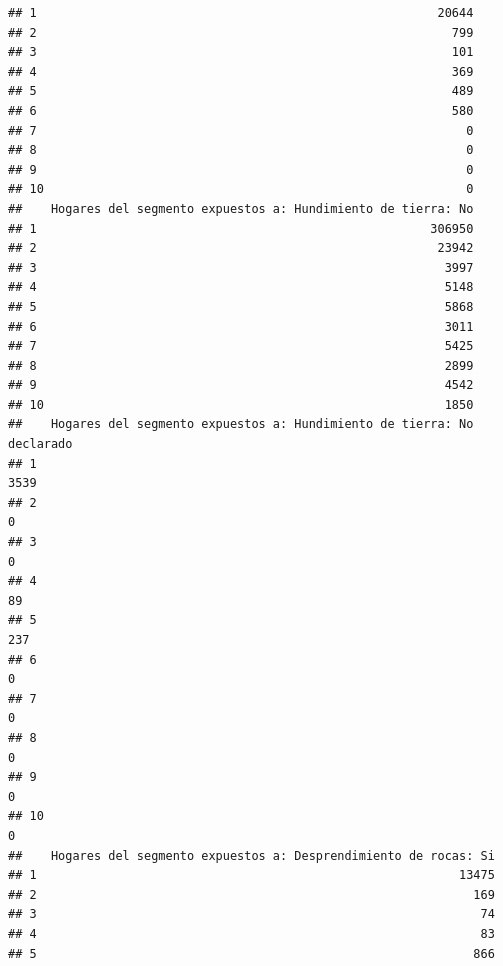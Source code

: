 \documentclass[11pt,]{article}
\begin{document}
\begin{verbatim}
## 1                                                        20644
## 2                                                          799
## 3                                                          101
## 4                                                          369
## 5                                                          489
## 6                                                          580
## 7                                                            0
## 8                                                            0
## 9                                                            0
## 10                                                           0
##    Hogares del segmento expuestos a: Hundimiento de tierra: No
## 1                                                       306950
## 2                                                        23942
## 3                                                         3997
## 4                                                         5148
## 5                                                         5868
## 6                                                         3011
## 7                                                         5425
## 8                                                         2899
## 9                                                         4542
## 10                                                        1850
##    Hogares del segmento expuestos a: Hundimiento de tierra: No declarado
## 1                                                                   3539
## 2                                                                      0
## 3                                                                      0
## 4                                                                     89
## 5                                                                    237
## 6                                                                      0
## 7                                                                      0
## 8                                                                      0
## 9                                                                      0
## 10                                                                     0
##    Hogares del segmento expuestos a: Desprendimiento de rocas: Si
## 1                                                           13475
## 2                                                             169
## 3                                                              74
## 4                                                              83
## 5                                                             866

\end{verbatim}
\end{document}
